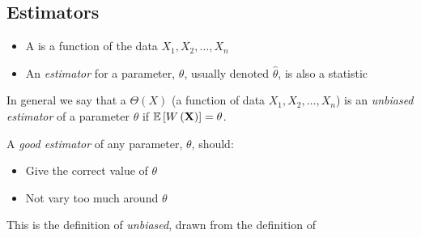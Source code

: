 	\subsection{Estimators} \label{subsec:Estimators}
		\begin{itemize}[noitemsep, nolistsep]
			\item A  is a function of the data $X_{1},X_{2},\ldots,X_{n}$
			\item An \emph{estimator} for a parameter, $\theta$, usually denoted $\hat{\theta}$, is also a statistic
		\end{itemize}
		\begin{definition} \label{def:Unbiased Estimator}
			In general we say that a  $\Theta (X)$ (a function of data $X_{1},X_{2},\ldots,X_{n}$) is an \emph{unbiased estimator} of a parameter $\theta$ if $\operatorname{\operatorname{\mathbb{E}}} \left[ W \left( \mathbf{X} \right) \right] = \theta$.
			\begin{remark}
				A \emph{good estimator} of any parameter, $\theta$, should:
				\begin{itemize}[noitemsep, nolistsep]
					\item Give the correct value of $\theta$
					\item Not vary too much around $\theta$
				\end{itemize}
			\end{remark}
			\begin{remark}
				This is the definition of \emph{unbiased}, drawn from the definition of 
			\end{remark}
		\end{definition}
	
